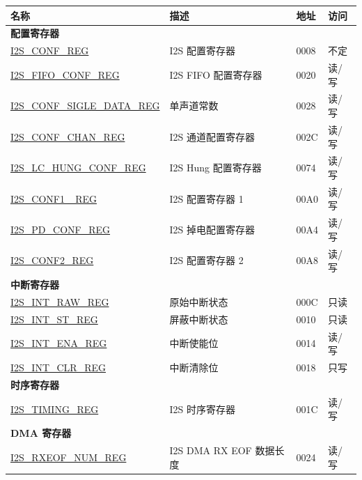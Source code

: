 \begin{longtable}{ | p{6cm} | p{7.2cm} | p{1.3cm} | p{1cm} | }
\hline\rowcolor{lightgray}
名称 & 描述 &  地址 & 访问 \\ \hline
\endhead
\multicolumn{4}{|l|}{\textbf{配置寄存器}} \\ \hline
\hyperref[regdesc:I2SCONFREG]{I2S\_CONF\_REG} & I2S 配置寄存器 & \hexprefix{}0008 & 不定 \\ \hline
\hyperref[regdesc:I2SFIFOCONFREG]{I2S\_FIFO\_CONF\_REG} & I2S FIFO 配置寄存器 & \hexprefix{}0020 & 读/写 \\ \hline
\hyperref[regdesc:I2SCONFSIGLEDATAREG]{I2S\_CONF\_SIGLE\_DATA\_REG} & 单声道常数 & \hexprefix{}0028 & 读/写 \\ \hline
\hyperref[regdesc:I2SCONFCHANREG]{I2S\_CONF\_CHAN\_REG} & I2S 通道配置寄存器 & \hexprefix{}002C & 读/写 \\ \hline
\hyperref[regdesc:I2SLCHUNGCONFREG]{I2S\_LC\_HUNG\_CONF\_REG} & I2S Hung 配置寄存器 & \hexprefix{}0074 & 读/写 \\ \hline
\hyperref[regdesc:I2SCONF1 REG]{I2S\_CONF1 \_REG} & I2S 配置寄存器 1 & \hexprefix{}00A0 & 读/写 \\ \hline
\hyperref[regdesc:I2SPDCONFREG]{I2S\_PD\_CONF\_REG} & I2S 掉电配置寄存器 & \hexprefix{}00A4 & 读/写 \\ \hline
\hyperref[regdesc:I2SCONF2REG]{I2S\_CONF2\_REG} & I2S 配置寄存器 2 & \hexprefix{}00A8 & 读/写 \\ \hline
\multicolumn{4}{|l|}{\textbf{中断寄存器}} \\ \hline
\hyperref[regdesc:I2SINTRAWREG]{I2S\_INT\_RAW\_REG} & 原始中断状态 & \hexprefix{}000C & 只读 \\ \hline
\hyperref[regdesc:I2SINTSTREG]{I2S\_INT\_ST\_REG} & 屏蔽中断状态 & \hexprefix{}0010 & 只读 \\ \hline
\hyperref[regdesc:I2SINTENAREG]{I2S\_INT\_ENA\_REG} & 中断使能位 & \hexprefix{}0014 & 读/写 \\ \hline
\hyperref[regdesc:I2SINTCLRREG]{I2S\_INT\_CLR\_REG} & 中断清除位 & \hexprefix{}0018 & 只写 \\ \hline
\multicolumn{4}{|l|}{\textbf{时序寄存器}} \\ \hline
\hyperref[regdesc:I2STIMINGREG]{I2S\_TIMING\_REG} & I2S 时序寄存器 & \hexprefix{}001C & 读/写 \\ \hline
\multicolumn{4}{|l|}{\textbf{DMA 寄存器}} \\ \hline
\hyperref[regdesc:I2SRXEOFNUMREG]{I2S\_RXEOF\_NUM\_REG} & I2S DMA RX EOF 数据长度 & \hexprefix{}0024 & 读/写 \\ \hline

\end{longtable}
